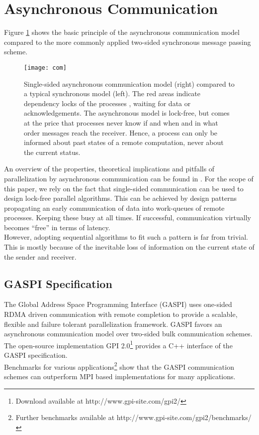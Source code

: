 \documentclass{acm_proc_article-sp}
\begin{document}
\section{Asynchronous Communication} \label{sec_ac} 
Figure \ref{fig_async} shows the basic principle of the asynchronous 
communication model compared to the more commonly applied two-sided
synchronous message passing scheme.
\begin{figure}[ht]
\texttt{[image: com]}
\caption{Single-sided asynchronous communication model (right) compared to a typical 
synchronous model (left). The red areas indicate dependency locks of the 
processes , waiting for data or acknowledgements. The asynchronous model
is lock-free, but comes at the price that processes never know if and when and 
in what order messages reach the receiver. Hence, a process can only be informed
about past states of a remote computation, never about the current status.   
\label{fig_async}
}
\end{figure}
An overview of the properties, theoretical implications and pitfalls of parallelization by 
asynchronous communication can be found in \cite{shan2012accelerating}. For the scope of this paper,
we rely on the fact that single-sided communication can be used to design lock-free
parallel algorithms. This can be achieved by design patterns propagating 
an early communication of data into work-queues of remote processes. Keeping
these busy at all times. If successful, communication virtually becomes ``free''
in terms of latency.\\
However, adopting sequential algorithms to fit such a pattern is far from trivial.
This is mostly because of the inevitable loss of information on the current state
of the sender and receiver.        

\subsection{GASPI Specification} \label{sec_gpi}
The Global Address Space Programming Interface (GASPI) \cite{grunewald2013gaspi}
 uses one-sided 
RDMA driven communication with remote completion to provide a scalable, flexible and
failure tolerant parallelization framework. GASPI favors an asynchronous communication 
model over two-sided bulk communication schemes. 
The open-source implementation GPI 2.0\footnote{Download available at http://www.gpi-site.com/gpi2/}
provides a C++ interface of the GASPI specification.\\
Benchmarks for various applications\footnote{Further benchmarks available at
http://www.gpi-site.com/gpi2/benchmarks/} show that 
the GASPI communication schemes can outperform MPI based implementations
\cite{grunewald2012bqcd} \cite{machado2011unbalanced} for many applications.
\end{document}
